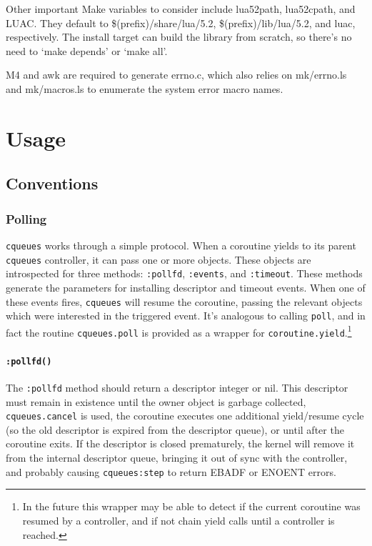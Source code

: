 \documentclass[11pt, oneside]{memoir}
\newcommand*{\cqueues}[0]{\texttt{cqueues}\xspace}
\newcommand*{\key}[1]{#1\index{#1}\xspace}
\newcommand*{\syscall}[1]{\texttt{#1}\xspace}
\newcommand*{\routine}[1]{\texttt{#1}\xspace}
\newcommand*{\method}[1]{\texttt{#1}\xspace}
\begin{document}
Other important Make variables to consider include lua52path, lua52cpath, and LUAC. They default to \$(prefix)/share/lua/5.2, \$(prefix)/lib/lua/5.2, and luac, respectively. The install target can build the library from scratch, so there's no need to `make depends' or `make all'.


\key{M4} and \key{awk} are required to generate errno.c, which also relies on mk/errno.ls and mk/macros.ls to enumerate the system error macro names.

\chapter{Usage}

\section{Conventions}


\subsection{Polling}

\cqueues works through a simple protocol. When a coroutine yields to its parent \cqueues controller, it can pass one or more objects. These objects are introspected for three methods: \method{:pollfd}, \method{:events}, and \method{:timeout}. These methods generate the parameters for installing descriptor and timeout events. When one of these events fires, \cqueues will resume the coroutine, passing the relevant objects which were interested in the triggered event. It's analogous to calling \syscall{poll}, and in fact the routine \routine{cqueues.poll} is provided as a wrapper for \routine{coroutine.yield}.\footnote{In the future this wrapper may be able to detect if the current coroutine was resumed by a controller, and if not chain yield calls until a controller is reached.}

\subsubsection[\method{object:pollfd}]{\method{:pollfd()}} The \method{:pollfd} method should return a descriptor integer or nil. This descriptor must remain in existence until the owner object is garbage collected, \routine{cqueues.cancel} is used, the coroutine executes one additional yield/resume cycle (so the old descriptor is expired from the descriptor queue), or until after the coroutine exits. If the descriptor is closed prematurely, the kernel will remove it from the internal descriptor queue, bringing it out of sync with the controller, and probably causing \method{cqueues:step} to return EBADF or ENOENT errors.
\end{document}
